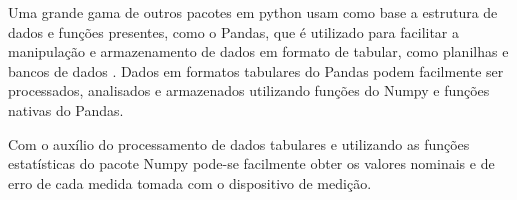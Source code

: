 

Uma grande gama de outros pacotes em python usam como base a estrutura de dados e funções presentes, como o Pandas, que é utilizado para facilitar a manipulação e
armazenamento de dados em formato de tabular, como planilhas e bancos de dados \autocite{DocsPandas_}.
Dados em formatos tabulares do Pandas podem facilmente ser processados, analisados e armazenados utilizando funções do Numpy e funções nativas do Pandas.

Com o auxílio do processamento de dados tabulares e utilizando as funções estatísticas do pacote Numpy pode-se facilmente obter os valores nominais e de erro de cada medida
tomada com o dispositivo de medição.

